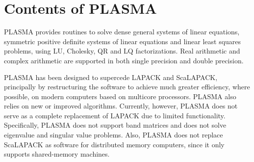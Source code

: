 
\chapter{Contents of PLASMA}


PLASMA provides routines to solve dense general systems of linear equations,
symmetric positive definite systems of linear equations and linear least squares
problems, using LU, Cholesky, QR and LQ factorizations. Real arithmetic and complex
arithmetic are supported in both single precision and double precision.

PLASMA has been designed to supercede LAPACK and ScaLAPACK, principally by
restructuring the software to achieve much greater efficiency, where possible,
on modern computers based on multicore processors. PLASMA also relies on new or
improved algorithms. Currently, however, PLASMA does not serve as a complete
replacement of LAPACK due to limited functionality. Specifically, PLASMA does
not support band matrices and does not solve eigenvalue and singular value
problems. Also, PLASMA does not replace ScaLAPACK as software for distributed
memory computers, since it only supports shared-memory machines.

